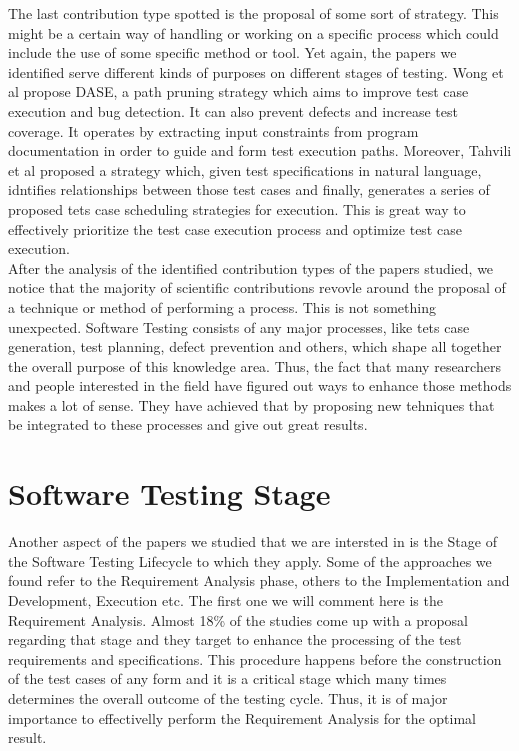 The last contribution type spotted is the proposal of some sort of strategy. This might be a certain way of handling or working on a specific process which 
could include the use of some specific method or tool. Yet again, the papers we identified serve different kinds of purposes on different stages 
of testing. Wong et al \cite{wong2015dase} propose DASE, a path pruning strategy which aims to improve test case execution and bug detection. It can also prevent 
defects and increase test coverage. It operates by extracting input constraints from program documentation in order to guide and form test execution paths. 
Moreover, Tahvili et al \cite{10.1145/3195538.3195540} proposed a strategy which, given test specifications in natural language, idntifies relationships 
between those test cases and finally, generates a series of proposed tets case scheduling strategies for execution. This is great way to effectively 
prioritize the test case execution process and optimize test case execution. \\

After the analysis of the identified contribution types of the papers studied, we notice that the majority of scientific contributions revovle around 
the proposal of a technique or method of performing a process. This is not something unexpected. Software Testing consists of any major processes, like 
tets case generation, test planning, defect prevention and others, which shape all together the overall purpose of this knowledge area. Thus, the fact that 
many researchers and people interested in the field have figured out ways to enhance those methods makes a lot of sense. They have achieved 
that by proposing new tehniques that be integrated to these processes and give out great results.

\section {Software Testing Stage}
Another aspect of the papers we studied that we are intersted in is the Stage of the Software Testing Lifecycle to which they apply. Some of the approaches we found refer to 
the Requirement Analysis phase, others to the Implementation and Development, Execution etc. The first one we will comment here is the Requirement Analysis. Almost 18\% of the studies 
come up with a proposal regarding that stage and they target to enhance the processing of the test requirements and specifications. This procedure happens before the construction 
of the test cases of any form and it is a critical stage which many times determines the overall outcome of the testing cycle. Thus, it is of major importance to effectivelly 
perform the Requirement Analysis for the optimal result. \\

